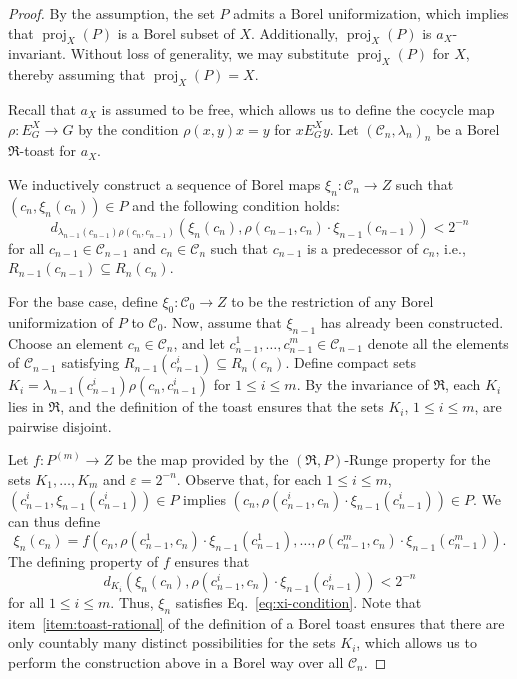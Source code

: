 \documentclass[10pt,a4paper]{amsart}
\renewcommand{\epsilon}{\varepsilon}
\newcommand{\mfR}{\mathfrak{R}}
\DeclareMathOperator{\proj}{\mathrm{proj}}
\begin{document}
\begin{proof}
  By the assumption, the set \(P\) admits a Borel uniformization, which implies that
  \(\proj_{X}(P)\) is a Borel subset of \(X\). Additionally, \(\proj_{X}(P)\) is
  \(a_{X}\)-invariant. Without loss of generality, we may substitute \(\proj_{X}(P)\) for \(X\),
  thereby assuming that \(\proj_{X}(P) = X\).

  Recall that \(a_{X}\) is assumed to be free, which allows us to define the cocycle map
  \(\rho : E_{G}^{X} \to G\) by the condition \(\rho(x, y)x = y\) for \(x E_{G}^{X} y\).  Let
  \((\mathcal{C}_{n}, \lambda_{n})_{n}\) be a Borel \(\mfR\)-toast for \(a_{X}\).

  We inductively construct a sequence of Borel maps \(\xi_{n} : \mathcal{C}_{n} \to Z\) such that
  \((c_{n}, \xi_{n}(c_{n})) \in P\) and the following condition holds:
  \begin{equation}
    \label{eq:xi-condition}
    d_{\lambda_{n-1}(c_{n-1})\rho(c_{n},c_{n-1})}(\xi_{n}(c_{n}),
    \rho(c_{n-1},c_{n})\cdot \xi_{n-1}(c_{n-1})) < 2^{-n}
  \end{equation}
  for all \(c_{n-1} \in \mathcal{C}_{n-1}\) and \(c_{n} \in \mathcal{C}_{n}\) such that \(c_{n-1} \)
  is a predecessor of \(c_{n}\), i.e., \(R_{n-1}(c_{n-1}) \subseteq R_{n}(c_{n})\).

  For the base case, define \(\xi_{0} : \mathcal{C}_{0} \to Z\) to be the restriction of any Borel
  uniformization of \(P\) to \(\mathcal{C}_{0}\). Now, assume that \(\xi_{n-1}\) has already been
  constructed. Choose an element \(c_{n} \in \mathcal{C}_{n}\), and let
  \(c_{n-1}^{1}, \ldots, c_{n-1}^{m} \in \mathcal{C}_{n-1}\) denote all the elements of
  \(\mathcal{C}_{n-1}\) satisfying \(R_{n-1}(c_{n-1}^{i}) \subseteq R_{n}(c_{n})\).  Define compact
  sets \(K_{i} = \lambda_{n-1}(c_{n-1}^{i})\rho(c_{n},c_{n-1}^{i})\) for \(1 \le i \le m\). By the
  invariance of \(\mfR\), each \(K_{i}\) lies in \(\mfR\), and the definition of the toast ensures
  that the sets \(K_{i}\), \(1 \le i \le m\), are pairwise disjoint.

  Let \(f : P^{(m)} \to Z\) be the map provided by the \((\mfR, P)\)-Runge property for the sets
  \(K_{1}, \ldots, K_{m}\) and \(\epsilon = 2^{-n}\). Observe that, for each \(1 \le i \le m\),
  \((c_{n-1}^{i}, \xi_{n-1}(c_{n-1}^{i})) \in P\) implies
  \((c_{n}, \rho(c_{n-1}^{i},c_{n})\cdot \xi_{n-1}(c_{n-1}^{i})) \in P\). We can thus define
  \[
    \xi_{n}(c_{n}) = f(c_{n}, \rho(c_{n-1}^{1},c_{n})\cdot \xi_{n-1}(c_{n-1}^{1}), \ldots,
    \rho(c_{n-1}^{m},c_{n})\cdot \xi_{n-1}(c_{n-1}^{m})).
  \]
  The defining property of \(f\) ensures that
  \[
    d_{K_{i}}(\xi_{n}(c_{n}), \rho(c_{n-1}^{i},c_{n})\cdot \xi_{n-1}(c_{n-1}^{i})) < 2^{-n}
  \]
  for all \(1 \le i \le m\).  Thus, \(\xi_{n}\) satisfies Eq.~\eqref{eq:xi-condition}.  Note that
  item~\eqref{item:toast-rational} of the definition of a Borel toast ensures that there are only
  countably many distinct possibilities for the sets \(K_{i}\), which allows us to perform the
  construction above in a Borel way over all \(\mathcal{C}_{n}\).


\end{proof}
\end{document}

